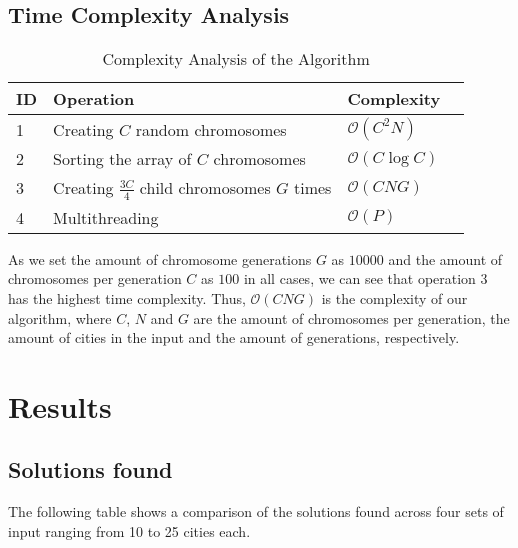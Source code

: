 \documentclass[twoside,twocolumn]{article}
\begin{document}
\subsection{Time Complexity Analysis}

\begin{table}[H]
\centering
\fontsize{7}{7}\selectfont
\label{my-label}
\begin{tabular}{|l|l|l|l|}
\hline
 \textbf{ID} & \textbf{Operation} & \textbf{Complexity} \\ \hline
 1 & Creating $C$ random chromosomes & $\mathcal{O}(C^2N)$ \\ \hline
 2 & Sorting the array of $C$ chromosomes & $\mathcal{O}(C\log{C})$ \\ \hline
 3 & Creating $\frac{3C}{4}$ child chromosomes $G$ times & $\mathcal{O}(CNG)$ \\ \hline
 4 & Multithreading & $\mathcal{O}(P)$ \\ \hline
\end{tabular}
\caption{Complexity Analysis of the Algorithm}
\end{table}

As we set the amount of chromosome generations $G$ as $10000$ and the amount of chromosomes per generation $C$ as $100$ in all cases, we can see that operation $3$ has the highest time complexity. Thus,  $\mathcal{O}(CNG)$ is the complexity of our algorithm, where $C$, $N$ and $G$ are the amount of chromosomes per generation, the amount of cities in the input and the amount of generations, respectively.
  
  
  \section{Results}
  
  
\subsection{Solutions found}

The following table shows a comparison of the solutions found across four sets of input ranging from 10 to 25 cities each.\linebreak
\end{document}
